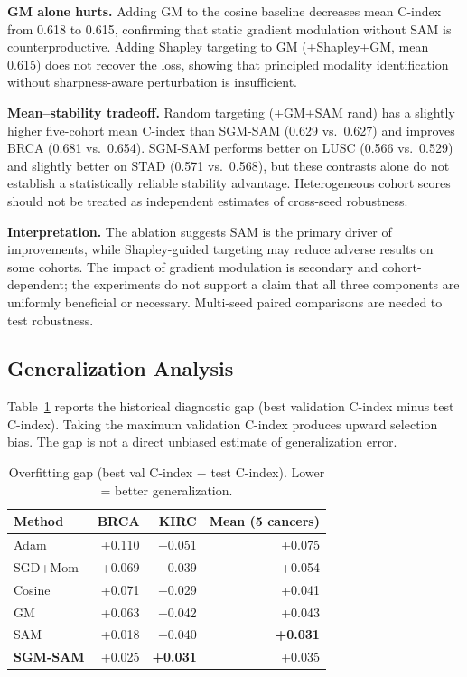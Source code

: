 \documentclass[runningheads]{llncs}
\begin{document}
\textbf{GM alone hurts.} Adding GM to the cosine baseline
decreases mean C-index from 0.618 to 0.615, confirming that static
gradient modulation without SAM is counterproductive. Adding Shapley
targeting to GM (+Shapley+GM, mean 0.615) does not recover the loss,
showing that principled modality identification without
sharpness-aware perturbation is insufficient.

\textbf{Mean--stability tradeoff.}
Random targeting (+GM+SAM rand) has a slightly higher
five-cohort mean C-index than SGM-SAM (0.629 vs.\ 0.627)
and improves BRCA (0.681 vs.\ 0.654). SGM-SAM performs better
on LUSC (0.566 vs.\ 0.529) and slightly better on STAD
(0.571 vs.\ 0.568), but these contrasts alone do not
establish a statistically reliable stability advantage.
Heterogeneous cohort scores should not be treated as
independent estimates of cross-seed robustness.

\textbf{Interpretation.}
The ablation suggests SAM is the primary driver of improvements,
while Shapley-guided targeting may reduce adverse results on
some cohorts. The impact of gradient modulation is secondary
and cohort-dependent; the experiments do not support a claim
that all three components are uniformly beneficial or necessary.
Multi-seed paired comparisons are needed to test robustness.

\subsection{Generalization Analysis}

Table~\ref{tab:overfitting} reports the historical diagnostic gap
(best validation C-index minus test C-index). Taking the maximum
validation C-index produces upward selection bias. The gap
is not a direct unbiased estimate of generalization error.

\begin{table}[ht]
\centering
\caption{Overfitting gap (best val C-index $-$ test C-index). Lower
= better generalization.}
\label{tab:overfitting}
\begin{tabular}{lrrr}
\toprule
Method & BRCA & KIRC & Mean (5 cancers) \\
\midrule
Adam      & +0.110 & +0.051 & +0.075 \\
SGD+Mom   & +0.069 & +0.039 & +0.054 \\
Cosine    & +0.071 & +0.029 & +0.041 \\
GM        & +0.063 & +0.042 & +0.043 \\
SAM       & +0.018 & +0.040 & \textbf{+0.031} \\
\textbf{SGM-SAM} & +0.025 & \textbf{+0.031} & +0.035 \\
\bottomrule
\end{tabular}
\end{table}
\end{document}
